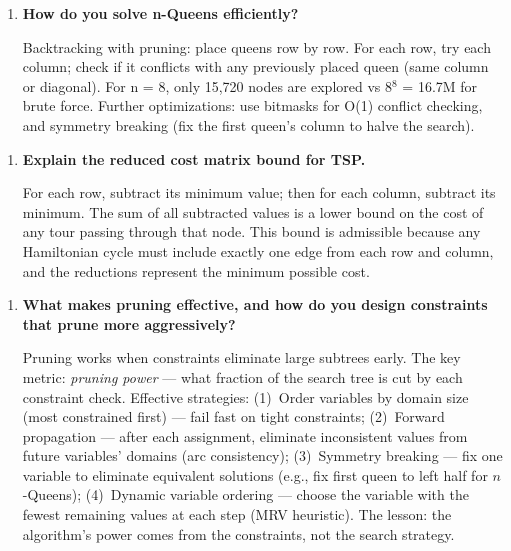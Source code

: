\begin{enumerate}
\item \textbf{How do you solve n-Queens efficiently?}

Backtracking with pruning: place queens row by row. For each row, try each column; check if it conflicts with any previously placed queen (same column or diagonal). For n = 8, only 15,720 nodes are explored vs 8$^{8}$ = 16.7M for brute force. Further optimizations: use bitmasks for O(1) conflict checking, and symmetry breaking (fix the first queen's column to halve the search).
\end{enumerate}

\begin{enumerate}
\item \textbf{Explain the reduced cost matrix bound for TSP.}

For each row, subtract its minimum value; then for each column, subtract its minimum. The sum of all subtracted values is a lower bound on the cost of any tour passing through that node. This bound is admissible because any Hamiltonian cycle must include exactly one edge from each row and column, and the reductions represent the minimum possible cost.
\end{enumerate}

\begin{enumerate}
\item \textbf{What makes pruning effective, and how do you design constraints that prune more aggressively?}

Pruning works when constraints eliminate large subtrees early. The key metric: \textit{pruning power} --- what fraction of the search tree is cut by each constraint check. Effective strategies: (1)~Order variables by domain size (most constrained first) --- fail fast on tight constraints; (2)~Forward propagation --- after each assignment, eliminate inconsistent values from future variables' domains (arc consistency); (3)~Symmetry breaking --- fix one variable to eliminate equivalent solutions (e.g., fix first queen to left half for $n$-Queens); (4)~Dynamic variable ordering --- choose the variable with the fewest remaining values at each step (MRV heuristic). The lesson: the algorithm's power comes from the constraints, not the search strategy.
\end{enumerate}


